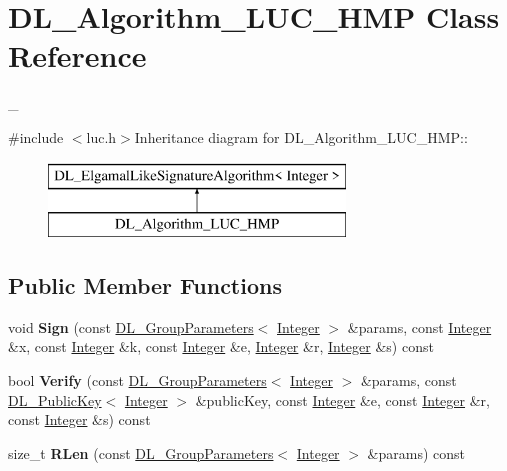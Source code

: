 \hypertarget{class_d_l___algorithm___l_u_c___h_m_p}{
\section{DL\_\-Algorithm\_\-LUC\_\-HMP Class Reference}
\label{class_d_l___algorithm___l_u_c___h_m_p}
}


\_\-  


{\ttfamily \#include $<$luc.h$>$}Inheritance diagram for DL\_\-Algorithm\_\-LUC\_\-HMP::\begin{figure}[H]
\begin{center}
\leavevmode
\includegraphics[height=2cm]{class_d_l___algorithm___l_u_c___h_m_p}
\end{center}
\end{figure}
\subsection*{Public Member Functions}
\begin{DoxyCompactItemize}
\item 
\hypertarget{class_d_l___algorithm___l_u_c___h_m_p_a7809c5bae42491cd2af402d41f37c49f}{
void {\bfseries Sign} (const \hyperlink{class_d_l___group_parameters}{DL\_\-GroupParameters}$<$ \hyperlink{class_integer}{Integer} $>$ \&params, const \hyperlink{class_integer}{Integer} \&x, const \hyperlink{class_integer}{Integer} \&k, const \hyperlink{class_integer}{Integer} \&e, \hyperlink{class_integer}{Integer} \&r, \hyperlink{class_integer}{Integer} \&s) const }
\label{class_d_l___algorithm___l_u_c___h_m_p_a7809c5bae42491cd2af402d41f37c49f}

\item 
\hypertarget{class_d_l___algorithm___l_u_c___h_m_p_aec08299059b87d523d590d5cfa4d0f2d}{
bool {\bfseries Verify} (const \hyperlink{class_d_l___group_parameters}{DL\_\-GroupParameters}$<$ \hyperlink{class_integer}{Integer} $>$ \&params, const \hyperlink{class_d_l___public_key}{DL\_\-PublicKey}$<$ \hyperlink{class_integer}{Integer} $>$ \&publicKey, const \hyperlink{class_integer}{Integer} \&e, const \hyperlink{class_integer}{Integer} \&r, const \hyperlink{class_integer}{Integer} \&s) const }
\label{class_d_l___algorithm___l_u_c___h_m_p_aec08299059b87d523d590d5cfa4d0f2d}

\item 
\hypertarget{class_d_l___algorithm___l_u_c___h_m_p_ace95ae645f120bb10d2a40ad26fb5ba4}{
size\_\-t {\bfseries RLen} (const \hyperlink{class_d_l___group_parameters}{DL\_\-GroupParameters}$<$ \hyperlink{class_integer}{Integer} $>$ \&params) const }
\label{class_d_l___algorithm___l_u_c___h_m_p_ace95ae645f120bb10d2a40ad26fb5ba4}

\end{DoxyCompactItemize}
